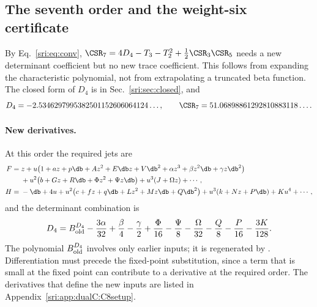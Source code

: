 \subsection{The seventh order and the weight-six certificate}\label{sri:app:dualC:C7}
By Eq.~\eqref{sri:eq:conv}, $\CSR_7=4D_4-T_3-T_2^2+\frac12\CSR_3\CSR_5$ needs a new determinant coefficient but no new
trace coefficient. This follows from expanding the characteristic polynomial, not from extrapolating a truncated beta
function. The closed form of $D_4$ is in Sec.~\ref{sri:sec:closed}, and
\begin{equation}
 D_4=-2.5346297995382501152606064124\ldots,\qquad \CSR_7=51.06898861292810883118\ldots .
\end{equation}

\paragraph{New derivatives.} At this order the required jets are
\begin{equation}
\begin{aligned}
 F={}&z+u\bigl(1+az+p\db+Az^2+E\db z+V\db^2+\alpha z^3+\beta z^2\db+\gamma z\db^2\bigr)\\
 &+u^2\bigl(b+Gz+R\db+\Phi z^2+\Psi z\db\bigr)+u^3(J+\Omega z)+\cdots,\\
 H={}&-\db+4u+u^2\bigl(c+fz+q\db+Lz^2+Mz\db+Q\db^2\bigr)+u^3(k+Nz+P\db)+Ku^4+\cdots,
\end{aligned}
\label{sri:eq:dualC:C7jets}
\end{equation}
and the determinant combination is
\begin{equation}
 D_4=B^{D_4}_{\rm old}-\frac{3\alpha}{32}+\frac\beta4-\frac\gamma2+\frac\Phi{16}-\frac\Psi8-\frac\Omega{32}
 -\frac Q8-\frac P{16}-\frac{3K}{128}.
 \label{sri:eq:dualC:D4assembly}
\end{equation}
The polynomial $B^{D_4}_{\rm old}$ involves only earlier inputs; it is regenerated by
. Differentiation must precede the
fixed-point substitution, since a term that is small at the fixed point can contribute to a derivative at the
required order. The derivatives that define the new inputs are listed in Appendix~\ref{sri:app:dualC:C8setup}.

